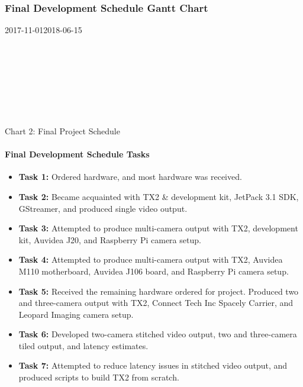 \subsubsection{Final Development Schedule Gantt Chart}
	\begin{ganttchart}
    	[hgrid, x unit=0.77mm, y unit chart=9.0mm, title label font=\normalsize, time slot format=isodate]
    	{2017-11-01}{2018-06-15}
    	\\
    	\\
    	\\
    	\\
    	\\
    	\\
    	\\
    	\\
	\end{ganttchart}
\begin{center}
	Chart 2: Final Project Schedule
\end{center}	

\paragraph{Final Development Schedule Tasks}
\begin{itemize}
	\item\textbf{Task 1:} Ordered hardware, and most hardware was received.\\
	\item\textbf{Task 2:} Became acquainted with TX2 \& development kit, JetPack 3.1 SDK, GStreamer, and produced single video output. \\
	\item\textbf{Task 3:} Attempted to produce multi-camera output with TX2, development kit, Auvidea J20, and Raspberry Pi camera setup. \\
	\item\textbf{Task 4:} Attempted to produce multi-camera output with TX2, Auvidea M110 motherboard, Auvidea J106 board, and Raspberry Pi camera setup. \\
	\item\textbf{Task 5:} Received the remaining hardware ordered for project. Produced two and three-camera output with TX2, Connect Tech Inc Spacely Carrier, and Leopard Imaging camera setup. \\
	\item\textbf{Task 6:} Developed two-camera stitched video output, two and three-camera tiled output, and latency estimates. \\
	\item\textbf{Task 7:} Attempted to reduce latency issues in stitched video output, and produced scripts to build TX2 from scratch. \\
\end{itemize}